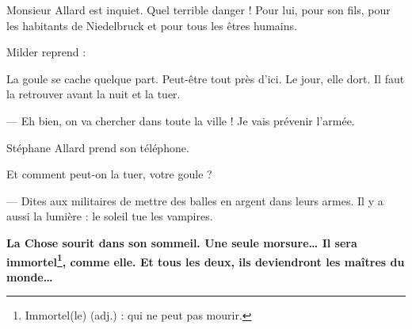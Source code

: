 Monsieur Allard est inquiet. Quel terrible danger ! Pour lui, pour son fils, pour les habitants de Niedelbruck et pour tous les
êtres humains. \fg{}

Milder reprend :

\og La goule se cache quelque part. Peut-être tout près d'ici. Le jour, elle dort. Il faut la retrouver avant la nuit et la tuer.

--- Eh bien, on va chercher dans toute la ville ! Je vais prévenir l'armée. \fg{}

Stéphane Allard prend son téléphone.

\og Et comment peut-on la tuer, votre goule ?

--- Dites aux militaires de mettre des balles en argent dans leurs armes. Il y a aussi la lumière : le soleil tue les vampires.
\fg{}

\textbf{La Chose sourit dans son sommeil. Une seule morsure\ldots{} Il sera immortel\footnote{Immortel(le) (adj.) : qui ne peut pas
mourir.}, comme elle. Et tous les deux, ils deviendront les maîtres du monde\ldots{}}
